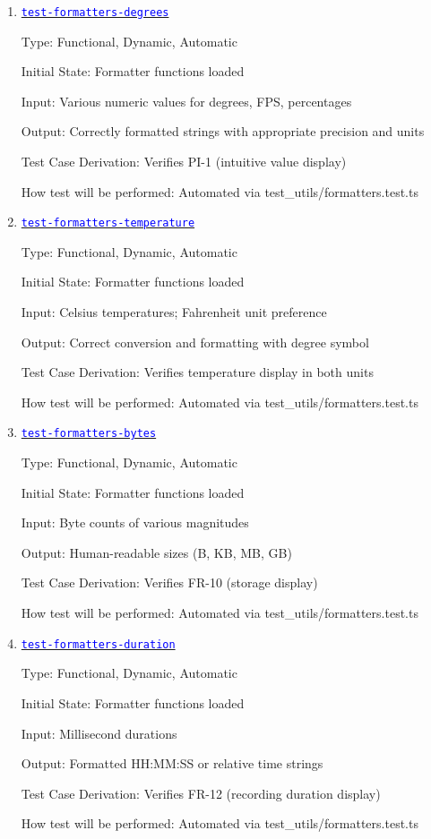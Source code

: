\documentclass[12pt, titlepage]{article}
\newcommand{\tid}[1]{\hyperlink{tid:#1}{\textcolor{blue}{\texttt{#1}}}}
\begin{document}
\begin{enumerate}

  \item{\tid{test-formatters-degrees}\\}

        Type: Functional, Dynamic, Automatic

        Initial State: Formatter functions loaded

        Input: Various numeric values for degrees, FPS, percentages

        Output: Correctly formatted strings with appropriate precision and units

        Test Case Derivation: Verifies PI-1 (intuitive value display)

        How test will be performed: Automated via test\_utils/formatters.test.ts

  \item{\tid{test-formatters-temperature}\\}

        Type: Functional, Dynamic, Automatic

        Initial State: Formatter functions loaded

        Input: Celsius temperatures; Fahrenheit unit preference

        Output: Correct conversion and formatting with degree symbol

        Test Case Derivation: Verifies temperature display in both units

        How test will be performed: Automated via test\_utils/formatters.test.ts

  \item{\tid{test-formatters-bytes}\\}

        Type: Functional, Dynamic, Automatic

        Initial State: Formatter functions loaded

        Input: Byte counts of various magnitudes

        Output: Human-readable sizes (B, KB, MB, GB)

        Test Case Derivation: Verifies FR-10 (storage display)

        How test will be performed: Automated via test\_utils/formatters.test.ts

  \item{\tid{test-formatters-duration}\\}

        Type: Functional, Dynamic, Automatic

        Initial State: Formatter functions loaded

        Input: Millisecond durations

        Output: Formatted HH:MM:SS or relative time strings

        Test Case Derivation: Verifies FR-12 (recording duration display)

        How test will be performed: Automated via test\_utils/formatters.test.ts

\end{enumerate}
\end{document}
